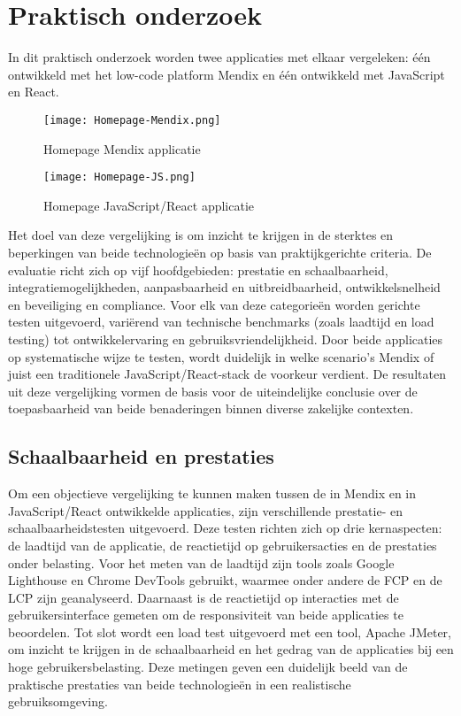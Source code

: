 \section{Praktisch onderzoek}
In dit praktisch onderzoek worden twee applicaties met elkaar vergeleken: één ontwikkeld met het low-code platform Mendix en één ontwikkeld met JavaScript en React. 

\begin{figure}[H]
    \centering
    \captionsetup{justification=centering} 
    \texttt{[image: Homepage-Mendix.png]}
    \caption[Homepage Mendix applicatie]{\label{fig:homepage-mendix} Homepage Mendix applicatie }
\end{figure}

\begin{figure}[H]
    \centering
    \captionsetup{justification=centering}
    \texttt{[image: Homepage-JS.png]}
    \caption[Homepage Mendix applicatie]{\label{fig:homepage-JavaScript} Homepage JavaScript/React applicatie }
\end{figure}

Het doel van deze vergelijking is om inzicht te krijgen in de sterktes en beperkingen van beide technologieën op basis van praktijkgerichte criteria. De evaluatie richt zich op vijf hoofdgebieden: prestatie en schaalbaarheid, integratiemogelijkheden, aanpasbaarheid en uitbreidbaarheid, ontwikkelsnelheid en beveiliging en compliance. Voor elk van deze categorieën worden gerichte testen uitgevoerd, variërend van technische benchmarks (zoals laadtijd en load testing) tot ontwikkelervaring en gebruiksvriendelijkheid. Door beide applicaties op systematische wijze te testen, wordt duidelijk in welke scenario’s Mendix of juist een traditionele JavaScript/React-stack de voorkeur verdient. De resultaten uit deze vergelijking vormen de basis voor de uiteindelijke conclusie over de toepasbaarheid van beide benaderingen binnen diverse zakelijke contexten.
\subsection{Schaalbaarheid en prestaties}
Om een objectieve vergelijking te kunnen maken tussen de in Mendix en in JavaScript/React ontwikkelde applicaties, zijn verschillende prestatie- en schaalbaarheidstesten uitgevoerd. Deze testen richten zich op drie kernaspecten: de laadtijd van de applicatie, de reactietijd op gebruikersacties en de prestaties onder belasting. Voor het meten van de laadtijd zijn tools zoals Google Lighthouse en Chrome DevTools gebruikt, waarmee onder andere de \gls{FCP} en de \gls{LCP} zijn geanalyseerd. Daarnaast is de reactietijd op interacties met de gebruikersinterface gemeten om de responsiviteit van beide applicaties te beoordelen. Tot slot wordt een load test uitgevoerd met een tool, Apache JMeter, om inzicht te krijgen in de schaalbaarheid en het gedrag van de applicaties bij een hoge gebruikersbelasting. Deze metingen geven een duidelijk beeld van de praktische prestaties van beide technologieën in een realistische gebruiksomgeving.

